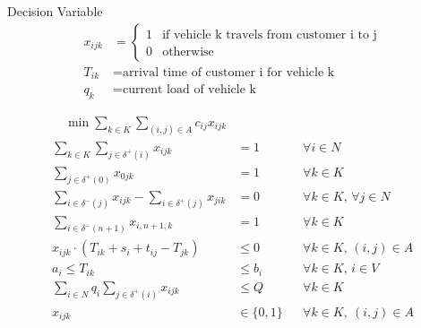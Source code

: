 \documentclass[twocolumn, 10pt]{article}
\begin{document}
Decision Variable
\begin{align*}
    x_{ijk} &= \begin{cases}
        1 & \text{if vehicle k travels from customer i to j} \\
        0 & \text{otherwise}
    \end{cases} \\
    T_{ik} &= \text{arrival time of customer i for vehicle k} \\
    q_k &= \text{current load of vehicle k}
\end{align*}


\begin{align}
    \quad \min \sum_{k \in K} \sum_{(i,j) \in A} c_{ij} x_{ijk} && \tag{5.1} \\
    \sum_{k \in K} \sum_{j \in \delta^+(i)} x_{ijk} &= 1 && \forall i \in N \tag{5.2} \\
    \sum_{j \in \delta^+(0)} x_{0jk} &= 1 && \forall k \in K \tag{5.3} \\
    \sum_{i \in \delta^-(j)} x_{ijk} - \sum_{i \in \delta^+(j)} x_{jik} &= 0 && \forall k \in K,\, \forall j \in N \tag{5.4} \\
    \sum_{i \in \delta^-(n+1)} x_{i,n+1,k} &= 1 && \forall k \in K \tag{5.5} \\
    x_{ijk} \cdot (T_{ik} + s_i + t_{ij} - T_{jk}) &\leq 0 && \forall k \in K,\, (i, j) \in A \tag{5.6} \\
    a_i \leq T_{ik} &\leq b_i && \forall k \in K,\, i \in V \tag{5.7} \\
    \sum_{i \in N} q_i \sum_{j \in \delta^+(i)} x_{ijk} &\leq Q && \forall k \in K \tag{5.8} \\
    x_{ijk} &\in \{0, 1\} && \forall k \in K,\ (i, j) \in A \tag{5.9}
\end{align}
\end{document}

